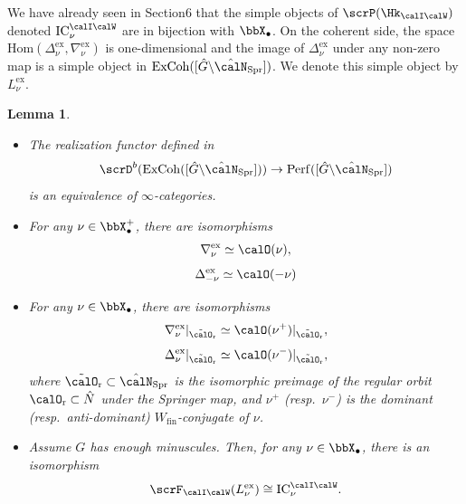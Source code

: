 \documentclass[10pt, reqno]{amsart}
\theoremstyle{plain}
\newtheorem{lemma}[theorem]{Lemma}
\theoremstyle{definition}
\numberwithin{equation}{section}
\begin{document}
We have already seen in Section6 that the simple objects of $\scrP(\Hk_{\calI\calW})$ denoted $\mathrm{IC}^{\calI\calW}_\nu$ are in bijection with $\bbX_{\bullet}$. On the coherent side, the space $\mathrm{Hom}(\Delta_\nu^\mathrm{ex},\nabla_\nu^\mathrm{ex})$ is one-dimensional and the image of $\Delta_\nu^\mathrm{ex}$ under any non-zero map is a simple object in $\mathrm{ExCoh}([\hat{G} \backslash\hat{\calN}_{\mathrm{Spr}}])$. We denote this simple object by $L_\nu^\mathrm{ex}$. 
\begin{lemma} \label{lemma_props_of_std_cstd_simple_ex_sheaves}
	\begin{itemize}
		\item[(1)] The realization functor defined in \cite[Section 3.1]{BBDG18}
		$$
		\scrD^b(\mathrm{ExCoh}([\hat{G}\backslash\hat{\calN}_\mathrm{Spr}]))\rightarrow \mathrm{Perf}([\hat{G}\backslash\hat{\calN}_\mathrm{Spr}])
		$$
		is an equivalence of $\infty$-categories. 
		\item [(2)] For any $\nu\in \bbX_\bullet^+$, there are isomorphisms
		\begin{equation}
			\nabla_\nu^\mathrm{ex}\simeq \calO(\nu),
		\end{equation}
		\begin{equation}
			\Delta_{-\nu}^\mathrm{ex}\simeq \calO(-\nu)
		\end{equation}  
		\item[(3)] For any $\nu\in \bbX_\bullet$, there are isomorphisms
		\begin{equation}
			\nabla_\nu^\mathrm{ex}|_{\tilde{\calO}_{\mathrm{r}}}\simeq \calO(\nu^+)|_{\tilde{\calO}_{\mathrm{r}}},
		\end{equation}
		\begin{equation}
			\Delta_\nu^\mathrm{ex}|_{\tilde{\calO}_{\mathrm{r}}}\simeq \calO(\nu^-)|_{\tilde{\calO}_{\mathrm{r}}},
		\end{equation} where $\tilde{\calO}_{\mathrm{r}} \subset \hat{\calN}_{\mathrm{Spr}}$ is the isomorphic preimage of the regular orbit $\calO_\mathrm{r}\subset \hat{N}$ under the Springer map, and $\nu^+$ (resp.~$\nu^-$) is the dominant (resp.~anti-dominant) $W_\mathrm{fin}$-conjugate of $\nu$.
		\item[(4)] Assume $G$ has enough minuscules. Then, for any $\nu\in \bbX_\bullet$, there is an isomorphism
		\begin{equation}
			\scrF_{\calI\calW}(L_\nu^\mathrm{ex})\cong \mathrm{IC}_\nu^{\calI\calW}.
		\end{equation}
	\end{itemize}
\end{lemma}
\end{document}
